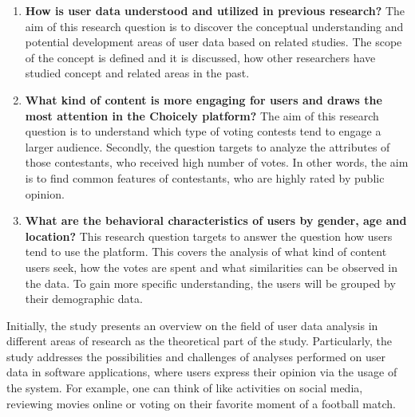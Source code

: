     \begin{enumerate}[label=RQ\arabic*:]
        \item \textbf{How is user data understood and utilized in previous research?} The aim of this research question is to discover the conceptual understanding and potential development areas of user data based on related studies. The scope of the concept is defined and it is discussed, how other researchers have studied concept and related areas in the past.
        
        \item \textbf{What kind of content is more engaging for users and draws the most attention in the Choicely platform?} The aim of this research question is to understand which type of voting contests tend to engage a larger audience. Secondly, the question targets to analyze the attributes of those contestants, who received high number of votes. In other words, the aim is to find common features of contestants, who are highly rated by public opinion.

        \item \textbf{What are the behavioral characteristics of users by gender, age and location?} This research question targets to answer the question how users tend to use the platform. This covers the analysis of what kind of content users seek, how the votes are spent and what similarities can be observed in the data. To gain more specific understanding, the users will be grouped by their demographic data.



    \end{enumerate}

    Initially, the study presents an overview on the field of user data analysis in different areas of research as the theoretical part of the study. Particularly, the study addresses the possibilities and challenges of analyses performed on user data in software applications, where users express their opinion via the usage of the system. For example, one can think of like activities on social media, reviewing movies online or voting on their favorite moment of a football match.

